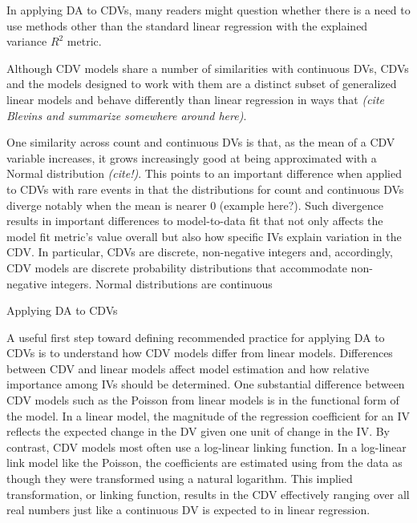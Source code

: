\documentclass[ShortAfour,times,sageapa]{sagej}
\begin{document}
	


	In applying DA to CDVs, many readers might question whether there is a need to use methods other than the standard linear regression with the explained variance $R^2$ metric.
	
	Although CDV models share a number of similarities with continuous DVs, CDVs and the models designed to work with them are a distinct subset of generalized linear models and behave differently than linear regression in ways that  \emph{(cite Blevins and summarize somewhere around here)}.
	
	One similarity across count and continuous DVs is that, as the mean of a CDV variable increases, it grows increasingly good at being approximated with a Normal distribution \emph{(cite!)}.  
	This points to an important difference when applied to CDVs with rare events in that the distributions for count and continuous DVs diverge notably when the mean is nearer 0 (example here?).  
	Such divergence results in important differences to model-to-data fit that not only affects the model fit metric's value overall but also how specific IVs explain variation in the CDV.  
	In particular, CDVs are discrete, non-negative integers and, accordingly, CDV models are discrete probability distributions that accommodate non-negative integers.  
	Normal distributions are continuous
	
	
	

	Applying DA to CDVs


	A useful first step toward defining recommended practice for applying DA to CDVs is to understand how CDV models differ from linear models.
	Differences between CDV and linear models affect model estimation and how relative importance among IVs should be determined.	
	One substantial difference between CDV models such as the Poisson from linear models is in the functional form of the model. 
	In a linear model, the magnitude of the regression coefficient for an IV reflects the expected change in the DV given one unit of change in the IV. 
	By contrast, CDV models most often use a log-linear linking function.
  	In a log-linear link model like the Poisson, the coefficients are estimated using from the data as though they were transformed using a natural logarithm.  This implied transformation, or linking function, results in the CDV effectively ranging over all real numbers just like a continuous DV is expected to in linear regression.
  	
\end{document}
